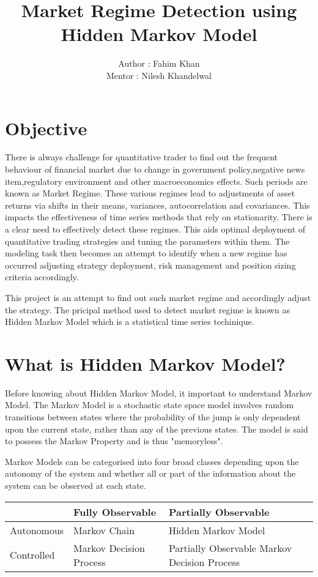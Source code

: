\documentclass{report}
\author{Author : Fahim Khan \\
		Mentor : Nilesh Khandelwal
}
\title{Market Regime Detection using Hidden Markov Model}
\begin{document}
\maketitle
\tableofcontents



\chapter{Objective}
There is always challenge for quantitative trader to find out the frequent behaviour of financial market due to change in government policy,negative news item,regulatory environment and other macroeconomics effects. Such periods are known as Market Regime.
These various regimes lead to adjustments of asset returns via shifts in their means, variances,
autocorrelation and covariances. This impacts the effectiveness of time series methods that rely
on stationarity.
There is a clear need to effectively detect these regimes. This aids optimal deployment of
quantitative trading strategies and tuning the parameters within them. The modeling task then
becomes an attempt to identify when a new regime has occurred adjusting strategy deployment,
risk management and position sizing criteria accordingly.\par

This project is an attempt to find out such market regime and accordingly adjust the strategy. The pricipal method used to detect market regime is known as Hidden Markov Model which is a statistical time series techinique.


\chapter{What is Hidden Markov Model?}
Before knowing about Hidden Markov Model, it important to understand Markov Model. The Markov Model is a stochastic state space model involves random transitions between states where the probability of the jump is only dependent upon the current state, rather than any of the previous states. The model is said to possess the Markov Property and is thus "memoryless".

Markov Models can be categorised into four broad classes depending upon the autonomy
of the system and whether all or part of the information about the system can be observed at
each state.

 
 

\begin{tabu} to 0.8\textwidth { | X[l] | X[c] | X[r] | }
 \hline
  & Fully Observable & Partially Observable \\
 \hline
   Autonomous & Markov Chain  & Hidden Markov Model  \\
\hline
Controlled & Markov Decision Process  & Partially Observable Markov Decision Process \\
\hline
\end{tabu}
\end{document}
